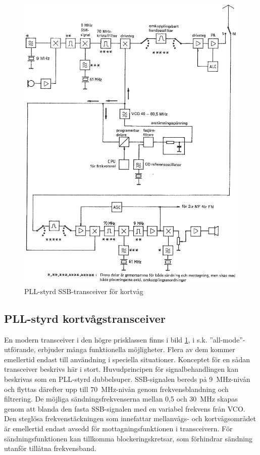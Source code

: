 \begin{figure}
  \includegraphics[width=\textwidth]{images/cropped_pdfs/bild_2_5-15.pdf}
  \caption{PLL-styrd SSB-transceiver för kortvåg}
  \label{fig:bildII5-15}
\end{figure}

\subsection{PLL-styrd kortvågstransceiver}

En modern transceiver i den högre prisklassen finns i bild \ref{fig:bildII5-15},
i s.k. ''all-mode''-utförande, erbjuder många funktionella möjligheter.
Flera av dem kommer emellertid endast till användning i speciella situationer.
Konceptet för en sådan transceiver beskrivs här i stort.
Huvudprincipen för signalbehandlingen kan beskrivas som en PLL-styrd
dubbelsuper.
SSB-signalen bereds på 9~MHz-nivån och flyttas därefter upp till
70~MHz-nivån genom frekvensblandning och filtrering.
De möjliga sändningsfrekvenserna mellan 0,5 och 30~MHz skapas genom att
blanda den fasta SSB-signalen med en variabel frekvens från VCO.
Den steglösa frekvenstäckningen som innefattar mellanvågs- och kortvågsområdet
är emellertid endast avsedd för mottagningsfunktionen i transceivern.
För sändningsfunktionen kan tillkomma blockeringskretsar, som förhindrar
sändning utanför tillåtna frekvensband.

